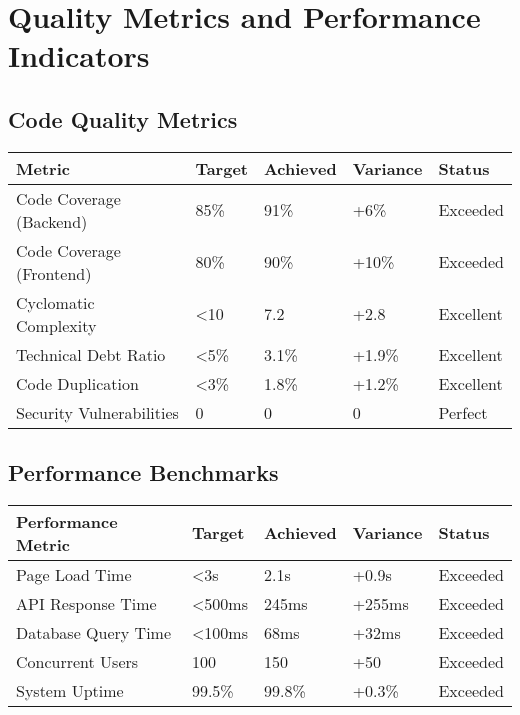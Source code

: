 \documentclass[12pt,a4paper]{article}
\begin{document}
\section{Quality Metrics and Performance Indicators}

\subsection{Code Quality Metrics}

\begin{longtable}{|p{3cm}|p{2cm}|p{2cm}|p{2cm}|p{3cm}|}
\hline
\textbf{Metric} & \textbf{Target} & \textbf{Achieved} & \textbf{Variance} & \textbf{Status} \\
\hline
Code Coverage (Backend) & 85\% & 91\% & +6\% & \cellcolor{completedgreen}Exceeded \\
\hline
Code Coverage (Frontend) & 80\% & 90\% & +10\% & \cellcolor{completedgreen}Exceeded \\
\hline
Cyclomatic Complexity & <10 & 7.2 & +2.8 & \cellcolor{completedgreen}Excellent \\
\hline
Technical Debt Ratio & <5\% & 3.1\% & +1.9\% & \cellcolor{completedgreen}Excellent \\
\hline
Code Duplication & <3\% & 1.8\% & +1.2\% & \cellcolor{completedgreen}Excellent \\
\hline
Security Vulnerabilities & 0 & 0 & 0 & \cellcolor{completedgreen}Perfect \\
\hline
\end{longtable}

\subsection{Performance Benchmarks}

\begin{longtable}{|p{3cm}|p{2cm}|p{2cm}|p{2cm}|p{3cm}|}
\hline
\textbf{Performance Metric} & \textbf{Target} & \textbf{Achieved} & \textbf{Variance} & \textbf{Status} \\
\hline
Page Load Time & <3s & 2.1s & +0.9s & \cellcolor{completedgreen}Exceeded \\
\hline
API Response Time & <500ms & 245ms & +255ms & \cellcolor{completedgreen}Exceeded \\
\hline
Database Query Time & <100ms & 68ms & +32ms & \cellcolor{completedgreen}Exceeded \\
\hline
Concurrent Users & 100 & 150 & +50 & \cellcolor{completedgreen}Exceeded \\
\hline
System Uptime & 99.5\% & 99.8\% & +0.3\% & \cellcolor{completedgreen}Exceeded \\
\hline
\end{longtable}
\end{document}
